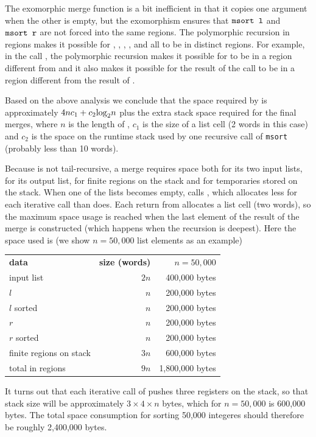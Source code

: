 \documentclass[12pt]{book}
\begin{document}
The exomorphic merge function is a bit inefficient in that it copies
one argument when the other is empty, but the exomorphism ensures that
$\hbox{\tt msort l}$ and $\hbox{\tt msort r}$ are not forced into the same
regions. The polymorphic recursion in regions makes it possible for
, , , , and 
all to be in distinct regions. For example, in the call , the polymorphic recursion makes it possible for  to be
in a region different from  and it also makes it possible for
the result of the call to be in a region different from the result of
.

Based on the above analysis we conclude that the space required by
 is approximately $4nc_1+c_2{\rm log}_2n$ plus the extra
stack space required for the final merges, where $n$ is 
the length of , $c_1$ is the size of a list cell (2 words in this
case) and $c_2$ is the space on the runtime stack used by one recursive call
of {\tt msort} (probably less than 10 words). 

Because  is not tail-recursive, a merge requires space
both for its two input lists, for its output list, for finite regions
on the stack and for temporaries stored on the stack.  When one of the
lists becomes empty,  calls , which allocates
less for each iterative call than  does. Each return from
 allocates a list cell (two words), so the maximum space
usage is reached when the last element of the result of the merge is
constructed (which happens when the recursion is deepest). Here the
space used is (we show $n = 50,000$ list elements as an example)
\begin{center}
\begin{tabular}{lrr}
{\bf data} & {\bf size (words)} &$n=50,000$\\
input list& $2n$ & 400,000 bytes\\
$l$ & $n$ & 200,000 bytes\\
$l$ sorted & $n$ & 200,000 bytes\\
$r$ & $n$ & 200,000 bytes\\
$r$ sorted & $n$ & 200,000 bytes\\
finite regions on stack & $3n$ & 600,000 bytes\\ \hline
total in regions& $9n$ & 1,800,000 bytes
\end{tabular}
\end{center}

It turns out that each iterative call of  pushes three
registers on the stack, so that stack size will be approximately
$3\times 4\times n$ bytes, which for $n=50,000$ is 600,000 bytes.  The
total space consumption for sorting 50,000 integeres should therefore
be roughly 2,400,000 bytes.
\end{document}

